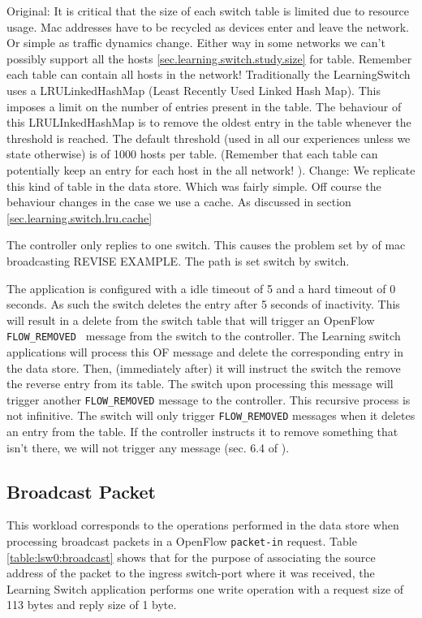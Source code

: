 \documentclass[12pt,openright,twoside]{report}
\begin{document}
Original: It is critical that the size of each switch table is limited 
due to resource usage.  Mac addresses have to be recycled as devices enter and leave the network. Or simple as traffic dynamics change. Either way in some networks we can't possibly support all the hosts \ref{sec.learning.switch.study.size} for table. Remember each table can contain all hosts in the network! Traditionally the LearningSwitch uses a LRULinkedHashMap (Least Recently Used Linked Hash Map). This imposes a limit on the number of entries present in the table. The behaviour of this LRULInkedHashMap is to remove the oldest entry in the table whenever the threshold is reached.  The default threshold (used in all our experiences unless we state otherwise) is of 1000 hosts per table. (Remember that each table can potentially keep an entry for each host in the all network! ). 
Change:  We replicate this kind of table in the data store. Which was fairly simple. Off course the behaviour changes in the case we use a cache. As discussed in section \ref{sec.learning.switch.lru.cache}

The controller only replies to one switch.  This causes the problem set by \cite{of.cpp} of mac broadcasting REVISE EXAMPLE.  The path is set switch by switch. 

The application is configured with a idle timeout of 5 and a hard timeout of 0 seconds. As such the switch deletes the entry after 5 seconds of inactivity. This will result in a delete from the switch table that will trigger an OpenFlow \texttt{FLOW\_REMOVED } message from the switch to the controller. The Learning switch applications will process this OF message and delete the corresponding entry in the data store. Then, (immediately after) it will instruct the switch the remove the reverse entry from its table. The switch upon processing this message will trigger another \texttt{FLOW\_REMOVED} message to the controller.  This recursive process is not infinitive. The switch will only trigger \texttt{FLOW\_REMOVED} messages when it deletes an entry from the table. If the controller instructs it to remove something that isn't there, we will not trigger any message (sec. 6.4 of \cite{openflow-spec}). 


\subsection{Broadcast Packet}
This workload corresponds to the operations performed in the data
store when processing broadcast packets in a OpenFlow
\texttt{packet-in} request.  Table \ref{table:lsw0:broadcast} shows that for the
purpose of associating the source address of the packet to the ingress
switch-port where it was received, the Learning Switch application performs one
write operation with a request size of 113 bytes and reply size of 1
byte. 
\end{document}
